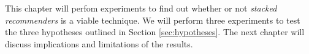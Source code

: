 \label{chap:results}

This chapter will perfom experiments to find out whether or not
\emph{stacked recommenders} is a viable technique.
We will perform three experiments to 
test the three hypotheses outlined in Section 
\ref{sec:hypotheses}.
The next chapter will discuss implications 
and limitations of the results.







%

